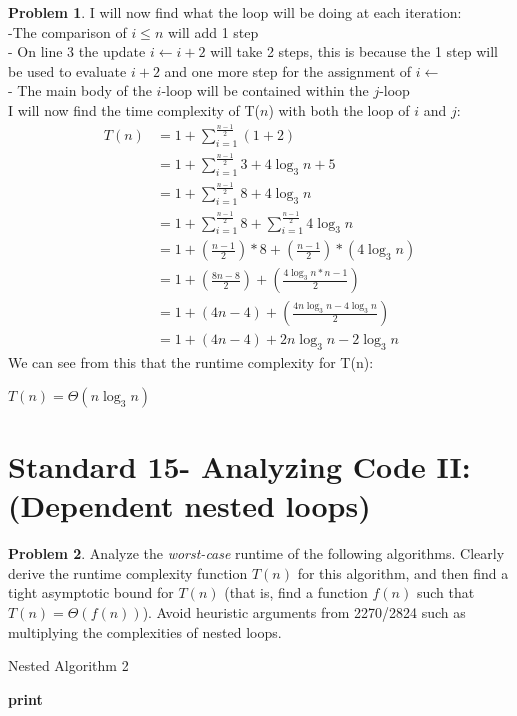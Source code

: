 \documentclass[11pt]{article}
\theoremstyle{definition}
\theoremstyle{definition}
\newtheorem{required}{Problem}
\theoremstyle{definition}
\begin{document}
\begin{required}
I will now find what the loop will be doing at each iteration: \\
\indent -The comparison of $i\leq n$ will add 1 step \\
\indent - On line 3 the update $i \leftarrow i + 2$ will take 2 steps, this is because the 1 step will be used to evaluate $i + 2$ and \indent one more step for the assignment of $i \leftarrow$ \\
\indent - The main body of the $i$-loop will be contained within the $j$-loop \\
I will now find the time complexity of T($n$) with both the loop of $i$ and $j$: \\
\begin{align*}
T(n)&= 1 + \sum_{i=1}^{\frac{n-1}{2}} (1 + 2 )  \\
&= 1 + \sum_{i=1}^{\frac{n-1}{2}} 3 +  4\log_3 n + 5\\
&= 1 + \sum_{i=1}^{\frac{n-1}{2}} 8 + 4\log_3 n \\
&= 1 + \sum_{i=1}^{\frac{n-1}{2}} 8 + \sum_{i=1}^{\frac{n-1}{2}} 4\log_3 n \\
&= 1 + (\frac{n-1}{2})*8 + (\frac{n-1}{2})*(4\log_3 n ) \\
&= 1+(\frac{8n-8}{2}) + (\frac{4\log_3 n*n-1}{2}) \\
&= 1 + (4n-4) + (\frac{4n\log_3 n - 4\log_3 n}{2}) \\
&= 1 + (4n-4) + 2n\log_3 n - 2\log_3 n
\end{align*}
We can see from this that the runtime complexity for T(n): \\
\begin{center}
$T(n) = \Theta(n\log_3 n)$
\end{center}
\end{required}

\newpage
\section{Standard 15- Analyzing Code II: (Dependent nested loops)}
\begin{required}


Analyze the \textit{worst-case} runtime of the following algorithms. Clearly derive the runtime complexity function $T(n)$ for this algorithm, and then find a tight asymptotic bound for $T(n)$ (that is, find a function $f(n)$ such that $T(n) = \Theta(f(n))$). Avoid heuristic arguments from 2270/2824 such as multiplying the complexities of nested loops.


\begin{algorithm}
\caption{Nested Algorithm 2}\label{alg:NestedDependent1}
\begin{algorithmic}[1]
		\State \textbf{print} 
	\EndFor
\EndFor
\EndProcedure
\end{algorithmic}
\end{algorithm}
\end{required}
\end{document}

